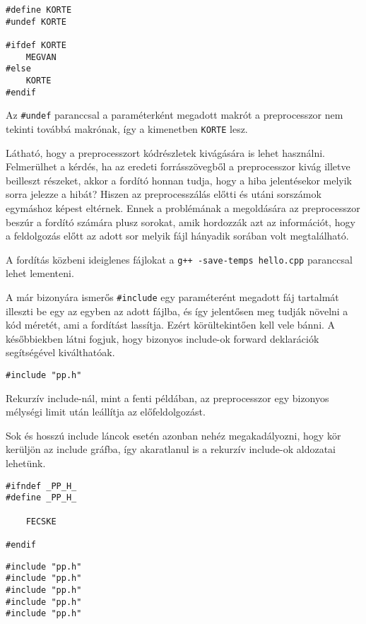 \documentclass[a4paper,11.5pt,table]{article}
\begin{document}
	\begin{lstlisting}
#define KORTE
#undef KORTE

#ifdef KORTE
	MEGVAN
#else
	KORTE
#endif
	\end{lstlisting}
	Az \texttt{\#undef} paranccsal a paraméterként megadott makrót a preprocesszor nem tekinti továbbá makrónak, így a kimenetben \texttt{KORTE} lesz.
	
	Látható, hogy a preprocesszort kódrészletek kivágására is lehet használni. 
  Felmerülhet a kérdés, ha az eredeti forrásszövegből a preprocesszor kivág illetve beilleszt részeket, akkor a fordító honnan tudja, hogy a hiba jelentésekor melyik sorra jelezze a hibát? Hiszen az preprocesszálás előtti és utáni sorszámok egymáshoz képest eltérnek. Ennek a problémának a megoldására az preprocesszor beszúr a fordító számára plusz sorokat, amik hordozzák azt az információt, hogy a feldolgozás előtt az adott sor melyik fájl hányadik sorában volt megtalálható. 
	\begin{note}
		 A fordítás közbeni ideiglenes fájlokat a \texttt{g++ -save-temps hello.cpp} paranccsal lehet lementeni.
	\end{note}
	A már bizonyára ismerős \texttt{\#include} egy paraméterént megadott fáj tartalmát illeszti be egy az egyben az adott fájlba, és így jelentősen meg tudják növelni a kód méretét, ami a fordítást lassítja. Ezért körültekintően kell vele bánni. A későbbiekben látni fogjuk, hogy bizonyos include-ok forward deklarációk segítségével kiválthatóak.
	\bigskip
	
	\begin{lstlisting}
#include "pp.h"
	\end{lstlisting}
		
	Rekurzív include-nál, mint a fenti példában, az preprocesszor egy bizonyos mélységi limit után leállítja az előfeldolgozást.
	
	Sok és hosszú include láncok esetén azonban nehéz megakadályozni, hogy kör kerüljön az include gráfba, így akaratlanul is a rekurzív include-ok aldozatai lehetünk.
	\bigskip
	
	\begin{lstlisting}
#ifndef _PP_H_
#define _PP_H_

	FECSKE

#endif
	\end{lstlisting}
	
	\begin{lstlisting}
#include "pp.h"
#include "pp.h"
#include "pp.h"
#include "pp.h"
#include "pp.h"
	\end{lstlisting}
	
\end{document}
